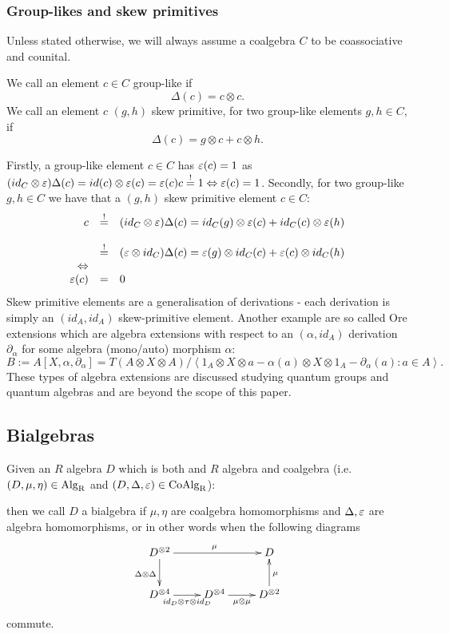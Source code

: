 \subsubsection{Group-likes and skew primitives}
Unless stated otherwise, we will always assume a coalgebra $C$ to be coassociative and counital.
\begin{defi}
We call an element $c \in C$ group-like if
$$\Delta(c) = c \otimes c.$$
We call an element $c$ $(g,h)$ skew primitive, for two group-like elements $g, h \in C$, if
$$\Delta(c) = g \otimes c + c \otimes h.$$
\end{defi}
Firstly, a group-like element $c \in C$ has $\eps(c) = 1$ as $(id_C \otimes \eps)\Delta(c) = id(c) \otimes \eps(c) = \eps(c) c \stackrel{!}{=} 1 \Leftrightarrow \eps(c) = 1$. Secondly, for two group-like $g, h \in C$ we have that a $(g,h)$ skew primitive element $c \in C$:
$$\bao{rcl}
c &\stackrel{!}{=}& (id_C \otimes \eps)\Delta(c) = id_C(g) \otimes \eps(c) + id_C(c) \otimes \eps(h)\\
&&\\
&\stackrel{!}{=}& (\eps \otimes id_C)\Delta(c) = \eps(g) \otimes id_C(c) + \eps(c) \otimes id_C(h)\\
\Leftrightarrow\\
\eps(c) &=& 0\\
\ea$$
\bmk Skew primitive elements are a generalisation of derivations - each derivation is simply an $(id_A,id_A)$ skew-primitive element. Another example are so called Ore extensions which are algebra extensions with respect to an $(\alpha,id_A)$ derivation $\partial_\alpha$ for some algebra (mono/auto) morphism $\alpha$:
$$B := A[X,\alpha,\partial_{\alpha}] = T(A \otimes X \otimes A)/\left<1_A \otimes X \otimes a - \alpha(a) \otimes X \otimes 1_A - \partial_{\alpha}(a) : a \in A\right>.$$
These types of algebra extensions are discussed studying quantum groups and quantum algebras and are beyond the scope of this paper.
\subsection{Bialgebras}
Given an $R$ algebra $D$ which is both and $R$ algebra and coalgebra (i.e. $(D,\mu,\eta) \in \rm{Alg}_R$ and $(D,\Delta,\eps) \in \rm{CoAlg}_R$):
\begin{defi}
then we call $D$ a bialgebra if $\mu, \eta$ are coalgebra homomorphisms and $\Delta, \eps$ are algebra homomorphisms, or in other words when the following diagrams
$$
\bao{ccc}
\xymatrix{
D^{\otimes 2} \ar[d]_{\Delta \otimes \Delta} \ar[rr]^\mu && D\\
D^{\otimes 4} \ar[r]_{id_D \otimes \tau \otimes id_D} & D^{\otimes 4} \ar[r]_{\mu \otimes \mu}& D^{\otimes 2}\ar[u]_{\mu}\\
}
\ea$$
commute.
\end{defi}